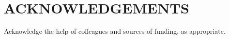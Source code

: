 \documentclass[letterpaper]{physor2020}
\begin{document}
\section*{ACKNOWLEDGEMENTS}

Acknowledge the help of colleagues and sources of funding, as appropriate.

\setlength{\baselineskip}{12pt}



\end{document}
